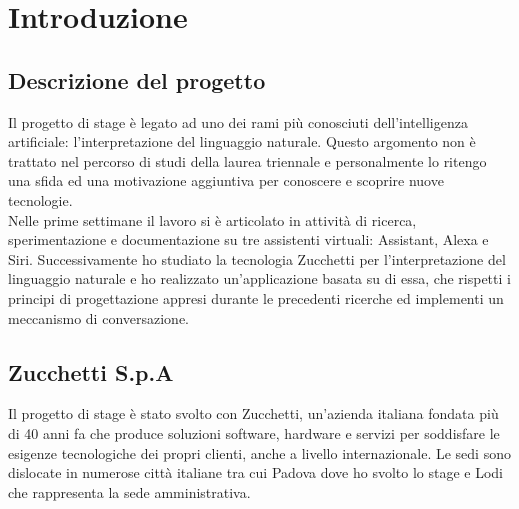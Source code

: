 
\chapter{Introduzione}
\label{cap:introduzione}





\section{Descrizione del progetto}
Il progetto di stage è legato ad uno dei rami più conosciuti dell'intelligenza artificiale: l'interpretazione del linguaggio naturale. Questo argomento non è trattato nel percorso di studi della laurea triennale e personalmente lo ritengo una sfida ed una motivazione aggiuntiva per conoscere e scoprire nuove tecnologie. \\
Nelle prime settimane il lavoro si è articolato in attività di ricerca, sperimentazione e documentazione su tre assistenti virtuali: Assistant, Alexa e Siri. Successivamente ho studiato la tecnologia Zucchetti per l'interpretazione del linguaggio naturale e ho realizzato un'applicazione basata su di essa, che rispetti i principi di progettazione appresi durante le precedenti ricerche ed implementi un meccanismo di conversazione.
\section{Zucchetti S.p.A}
Il progetto di stage è stato svolto con Zucchetti, un'azienda italiana fondata più di 40 anni fa che produce soluzioni software, hardware e servizi per soddisfare le esigenze tecnologiche dei propri clienti, anche a livello internazionale. Le sedi sono dislocate in numerose città italiane tra cui Padova dove ho svolto lo stage e Lodi che rappresenta la sede amministrativa.

